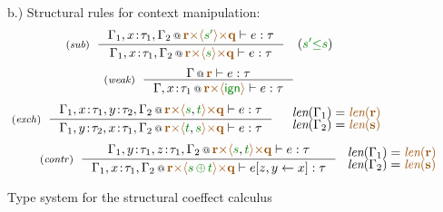 \begin{figure}[t]
\vspace{1em}
{\small b.) Structural rules for context manipulation:}
\begin{equation*}
\tyrule{sub}
  {\coctx{\Gamma_1,x\!:\!\tau_1,\Gamma_2}{\aclrd{\textbf{r}} \atimes \alift{\cclrd{s'}} \atimes \aclrd{\textbf{q}}} \vdash e : \tau}
  {\coctx{\Gamma_1,x\!:\!\tau_1,\Gamma_2}{\aclrd{\textbf{r}} \atimes \alift{\cclrd{s}} \atimes \aclrd{\textbf{q}}} \vdash e : \tau}
\quad
(\cclrd{s'} \cleq \cclrd{s})
\end{equation*}
\begin{equation*}
\tyrule{weak}
  {\coctx{\Gamma}{ \aclrd{\textbf{r}} } \vdash e : \tau}
  {\coctx{\Gamma,x \!:\! \tau_1}{\aclrd{\textbf{r}} \atimes \alift{ \czero }} \vdash e : \tau} 
\end{equation*}
\begin{equation*}
\tyrule{exch}
  {\coctx{\Gamma_1,x\!:\!\tau_1,y\!:\!\tau_2,\Gamma_2}{\aclrd{\textbf{r}} \atimes \alift{\cclrd{s},\cclrd{t}} \atimes \aclrd{\textbf{q}}} \vdash e : \tau}
  {\coctx{\Gamma_1,y\!:\!\tau_2,x\!:\!\tau_1,\Gamma_2}{\aclrd{\textbf{r}} \atimes \alift{\cclrd{t},\cclrd{s}} \atimes \aclrd{\textbf{q}}} \vdash e : \tau}
\quad
\begin{array}{l}
 \xlen{\Gamma_1} = \alen{\aclrd{\textbf{r}}}\\[-0.25em]
 \xlen{\Gamma_2} = \alen{\aclrd{\textbf{s}}}
\end{array}
\end{equation*}
\begin{equation*}
\hspace{2.5em} 
\tyrule{contr}
  {\coctx{\Gamma_1,y\!:\!\tau_1,z\!:\!\tau_1,\Gamma_2}{\aclrd{\textbf{r}} \atimes \alift{\cclrd{s},\cclrd{t}} \atimes \aclrd{\textbf{q}}} \vdash e : \tau}
  {\coctx{\Gamma_1,x\!:\!\tau_1,\Gamma_2}{\aclrd{\textbf{r}} \atimes \alift{\cclrd{s} \,\cpar\, \cclrd{t}} \atimes \aclrd{\textbf{q}}} \vdash \subst{e}{z,y}{x} : \tau}
~
\begin{array}{l}
 \xlen{\Gamma_1} = \alen{\aclrd{\textbf{r}}}\\[-0.25em]
 \xlen{\Gamma_2} = \alen{\aclrd{\textbf{s}}}
\end{array}
\end{equation*}

\caption{Type system for the structural coeffect calculus}
\label{fig:struct-types}
\end{figure}


